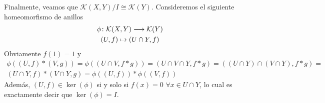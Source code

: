 \documentclass[twoside]{article}
\begin{document}
\begin{ejercicio}{6}
\begin{solucion}
Finalmente, veamos que $\mathcal{K}(X,Y)/I \cong \mathcal{K}(Y)$. Consideremos el siguiente homeomorfismo de anillos
\begin{gather*}
\phi\colon{\mathcal{K}(X,Y)}\longrightarrow{\mathcal{K}(Y)}\\
(U,f)\mapsto (U\cap Y,f)
\end{gather*}
Obviamente $f(1)=1$ y 
\begin{gather*}
\phi((U,f)\ast (V,g)) = \phi((U\cap V, f\ast g)) = (U\cap V \cap Y, f\ast g) = ((U\cap Y)\cap (V\cap Y), f \ast g) =\\
(U\cap Y, f) \ast (V\cap Y, g) = \phi((U,f))\ast \phi((V,f)) 
\end{gather*}
Además, $(U,f)\in \ker(\phi)$ si y solo si $f(x)=0$ $\forall x \in U \cap Y$, lo cual es exactamente decir que $\ker(\phi)=I$.
\end{solucion}
\end{ejercicio}
\end{document}

